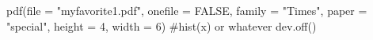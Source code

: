 \begin{Schunk}
\begin{Sinput}
 pdf(file = "myfavorite1.pdf", onefile = FALSE, family = "Times", paper = "special", height = 4, width = 6)
 #hist(x) or whatever
 dev.off()
\end{Sinput}
\end{Schunk}
